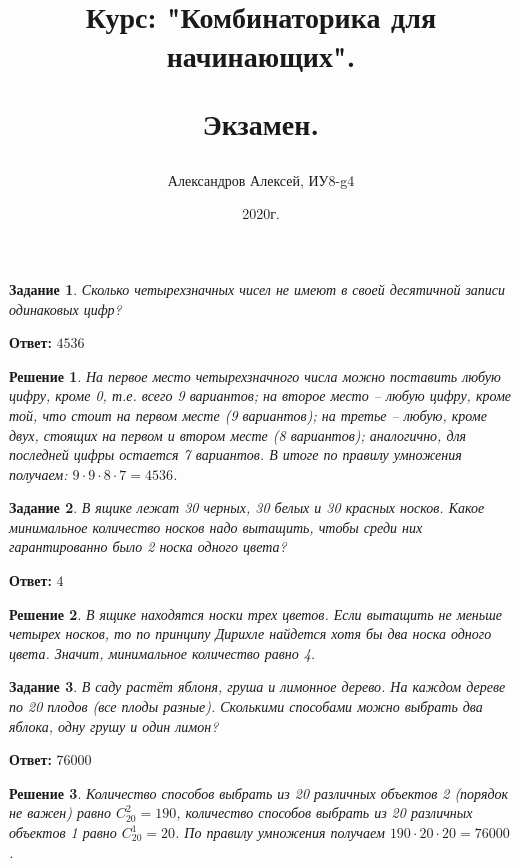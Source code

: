 \documentclass[a4paper,oneside]{memoir}
\title{Курс: "Комбинаторика для начинающих".
	
Экзамен.}
\author{Александров Алексей, ИУ8-g4}
\date{2020г.}
\newtheorem{task}{Задание}
\newtheorem{solution}{Решение}
\begin{document}
	
\maketitle

\begin{task}
Сколько четырехзначных чисел не имеют в своей десятичной записи одинаковых цифр?
\end{task}

\textbf{Ответ:} $ 4536 $

\begin{solution}
На первое место четырехзначного числа можно поставить любую цифру, кроме 0, т.е. всего 9 вариантов; на второе место -- любую цифру, кроме той, что стоит на первом месте (9 вариантов); на третье -- любую, кроме двух, стоящих на первом и втором месте (8 вариантов); аналогично, для последней цифры остается 7 вариантов. В итоге по правилу умножения получаем: $ 9\cdot 9\cdot 8\cdot 7 = 4536 $.
\end{solution}

\hrulefill

\begin{task}
	В ящике лежат 30 черных, 30 белых и 30 красных носков. Какое минимальное количество носков надо вытащить, чтобы среди них гарантированно было 2 носка одного цвета?
\end{task}

\textbf{Ответ:} $ 4 $

\begin{solution}
	В ящике находятся носки трех цветов. Если вытащить не меньше четырех носков, то по принципу Дирихле найдется хотя бы два носка одного цвета. Значит, минимальное количество равно 4.
\end{solution}

\hrulefill


\begin{task}
	В саду растёт яблоня, груша и лимонное дерево. На каждом дереве по 20 плодов (все плоды разные). Сколькими способами можно выбрать два яблока, одну грушу и один лимон?
\end{task}

\textbf{Ответ:} $ 76000 $

\begin{solution}
	Количество способов выбрать из 20 различных объектов 2 (порядок не важен) равно $ C_{20}^2 = 190 $, количество способов выбрать из 20 различных объектов 1 равно $ C_{20}^1 = 20 $. По правилу умножения получаем $ 190\cdot 20\cdot 20 = 76000 $.
\end{solution}
\end{document}

